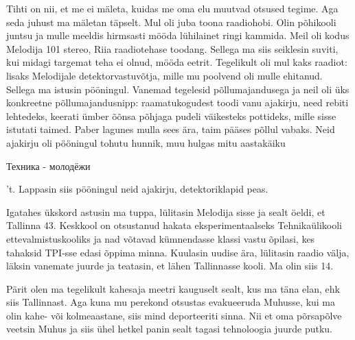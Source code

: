 

Tihti on nii, et me ei mäleta, kuidas me oma elu muutvad otsused  
tegime. Aga seda juhust ma mäletan täpselt. Mul oli juba toona 
raadiohobi. Olin põhikooli juntsu ja mulle meeldis hirmsasti mööda 
lühilainet ringi kammida. Meil oli kodus Melodija 101 stereo, Riia 
raadiotehase toodang. Sellega ma siis seiklesin suviti, kui midagi targemat 
teha ei olnud, mööda eetrit. Tegelikult oli mul kaks raadiot: lisaks Melodijale 
detektorvastuvõtja, mille mu poolvend 
oli mulle ehitanud. Sellega ma istusin pööningul. Vanemad tegelesid 
põllumajandusega ja neil oli 
üks konkreetne põllumajandusnipp: raamatukogudest toodi vanu ajakirju, 
need rebiti lehtedeks, keerati ümber õõnsa 
põhjaga pudeli väikesteks pottideks, mille sisse istutati taimed. 
Paber lagunes mulla sees ära, taim pääses põllul vabaks. Neid ajakirju oli 
pööningul tohutu hunnik, muu hulgas mitu aastakäiku 
\begin{russian}Техника - молодёжи\end{russian}'t. Lappasin siis 
pööningul neid ajakirju, detektoriklapid peas. 

Igatahes ükskord astusin ma tuppa, lülitasin Melodija sisse ja sealt öeldi, et 
Tallinna 43. Keskkool 
on otsustanud hakata 
eksperimentaalseks Tehnikaülikooli ettevalmistuskooliks ja 
nad võtavad kümnendasse klassi vastu õpilasi, kes tahaksid TPI-sse edasi õppima 
minna. Kuulasin uudise ära, lülitasin raadio välja, läksin vanemate juurde ja 
teatasin, et lähen Tallinnasse kooli. Ma olin siis 14.



Pärit olen ma tegelikult kahesaja meetri kauguselt sealt, kus ma täna elan, 
ehk siis Tallinnast. Aga kuna mu perekond otsustas evakueeruda 
Muhusse, kui ma olin kahe- või kolmeaastane, siis mind 
deporteeriti sinna. Nii et oma põrsapõlve veetsin Muhus ja siis ühel 
hetkel panin sealt tagasi tehnoloogia juurde putku. 

